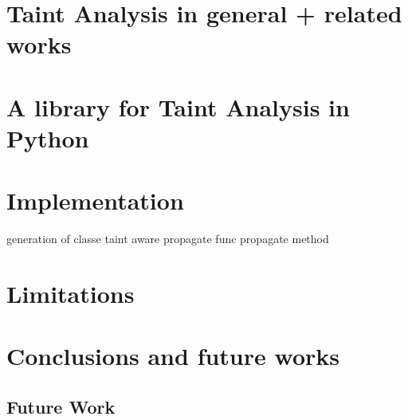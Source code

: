 \documentclass[a4paper]{report}
\begin{document}

\chapter{Taint Analysis in general + related works}
\label{Chap:taint}


\chapter{A library for Taint Analysis in Python}
\label{Chap:Library}


\chapter{Implementation}
\label{Chap:Implementation}

        generation of classe
        taint aware
        propagate func
        propagate method

\chapter{Limitations}
\label{Chap:Limitations}



\chapter{Conclusions and future works}
\label{Chap:Conclusions}


\section{Future Work}
\end{document}
